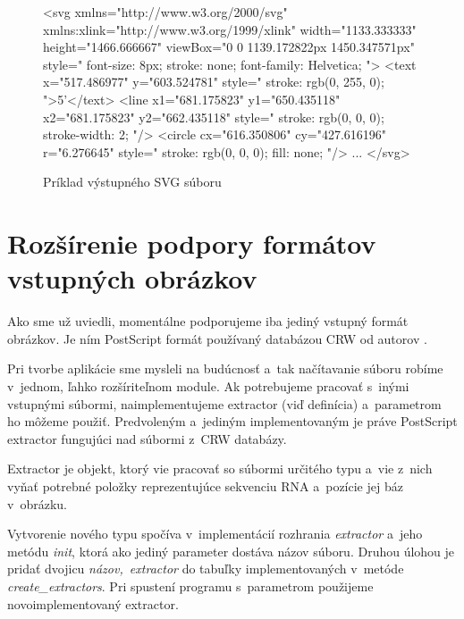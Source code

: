 \begin{figure}
\begin{code}[fontsize=\scriptsize, frame=none, samepage=true]
<svg xmlns="http://www.w3.org/2000/svg" xmlns:xlink="http://www.w3.org/1999/xlink"
  width="1133.333333" height="1466.666667" viewBox="0 0 1139.172822px 1450.347571px"
  style="
    font-size: 8px; 
    stroke: none; 
    font-family: Helvetica; ">
  <text 
    x="517.486977"
    y="603.524781"
    style="
      stroke: rgb(0, 255, 0); ">5'</text>
  <line 
    x1="681.175823"
    y1="650.435118" 
    x2="681.175823"
    y2="662.435118"
    style="
      stroke: rgb(0, 0, 0); 
      stroke-width: 2; "/>
  <circle 
    cx="616.350806"
    cy="427.616196"
    r="6.276645"
    style="
      stroke: rgb(0, 0, 0); 
      fill: none; "/>
  ...
</svg>
\end{code}
\caption{Príklad výstupného SVG súboru}
\label{obr:svg_out}
\end{figure}





\section{Rozšírenie podpory formátov vstupných obrázkov}
\label{kap:rozsirenie}

Ako sme už uviedli, momentálne podporujeme iba jediný vstupný formát obrázkov.
Je ním PostScript formát používaný databázou CRW od autorov \citet{CRW}.

Pri tvorbe aplikácie sme mysleli na budúcnosť a~tak načítavanie súboru
robíme v~jednom, ľahko rozšíriteľnom module.
Ak potrebujeme pracovať s~inými vstupnými súbormi, naimplementujeme extractor
(viď definícia) a~parametrom  ho môžeme použiť.
Predvoleným a~jediným implementovaným je práve PostScript extractor
fungujúci nad súbormi z~CRW databázy.

\begin{definice}
  Extractor je objekt, ktorý vie pracovať so súbormi určitého typu
  a~vie z~nich vyňať potrebné položky reprezentujúce sekvenciu RNA
  a~pozície jej báz v~obrázku.
\end{definice}

\renewcommand{\tagt}[1]{\mbox{\textit{#1}}}

Vytvorenie nového typu spočíva v~implementácií rozhrania \tagt{extractor}
a~jeho metódu \tagt{init}, ktorá ako jediný parameter dostáva názov súboru.
Druhou úlohou je pridať dvojicu \tagt{názov, extractor} do tabuľky
implementovaných v~metóde \tagt{create\_extractors}.
Pri spustení programu s~parametrom  použijeme
novoimplementovaný extractor.


